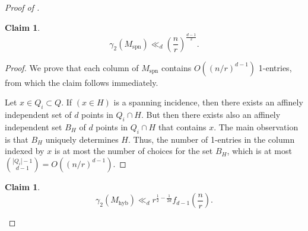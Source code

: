 \documentclass[11pt]{article}
\theoremstyle{plain}
\newtheorem{claim}[theorem]{Claim}
\theoremstyle{definition}
\begin{document}
\begin{proof}[Proof of ]
		\begin{claim}
			$$\gamma_2(M_{\text{spn}})\ll_d \left(\frac{n}{r}\right)^{\frac{d-1}{2}}.$$
		\end{claim}
		
		\begin{proof}
			We prove that each column of $M_{\text{spn}}$ contains $O((n/r)^{d-1})$ 1-entries, from which the claim follows immediately.
			
			Let $x\in Q_i\subset Q$. If $(x\in H)$ is a spanning incidence, then there exists an affinely independent set of $d$ points in $Q_i\cap H$. But then there exists also an affinely independent set $B_H$ of $d$ points in $Q_i\cap H$ that contains $x$. The main observation is that $B_H$ uniquely determines $H$. Thus, the number of 1-entries in the column indexed by $x$ is at most the number of choices for the set $B_H$, which is at most $\binom{|Q_i|-1}{d-1}=O((n/r)^{d-1})$.  
		\end{proof}
		
		\begin{claim}
			$$\gamma_2(M_{\text{hyb}})\ll_d r^{\frac{1}{2}-\frac{1}{2d}}f_{d-1}\left(\frac{n}{r}\right).$$
		\end{claim}
		

\end{proof}
\end{document}
